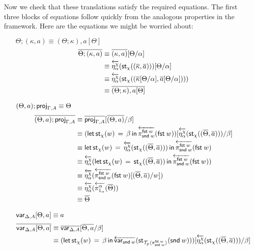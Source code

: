 \documentclass[10pt]{article}
\theoremstyle{definition}
\newcommand\dsd[1]{\ensuremath{\mathsf{#1}}}
\newcommand{\app}[2]{\ensuremath{#1 \: #2}}
\newcommand{\fst}[1]{\app{\dsd{fst}}{#1}}
\newcommand{\snd}[1]{\app{\dsd{snd}}{#1}}
\newcommand{\rewrite}[2]{\overleftarrow{#1}(#2)}
\newcommand\StI[2]{\ensuremath{\mathsf{st}_{#1}(#2)}}
\newcommand\StE[4]{\ensuremath{\mathsf{let} \, \StI{#1}{#3} \, = \, {#2} \, \mathsf{in} \, #4}}
\newcommand\ApEl[2]{\mathcal{T}_{#1}\langle#2\rangle}
\begin{document}
Now we check that these translations satisfy the required equations. The first three blocks of equations follow quickly from the analogous properties in the framework. Here are the equations we might be worried about:
\begin{enumerate}[style = multiline, labelwidth = 80pt]
\item[{$\Theta ; (\kappa , a) \equiv (\Theta ; \kappa) , a[\Theta]$}] 
\begin{align*}
\upstairs{\Theta ; (\kappa , a)}
&\equiv \upstairs{(\kappa, a)}[\Theta/\alpha] \\
&\equiv \rewrite{\eta^\chi_{\alpha}}{\StI{\chi}{(\upstairs{\kappa}, \upstairs{a})}}[\Theta/\alpha] \\
&\equiv \rewrite{\eta^\chi_{\alpha}}{\StI{\chi}{(\upstairs{\kappa}[\Theta/\alpha], \upstairs{a}[\Theta/\alpha])}} \\
&\equiv \upstairs{(\Theta ; \kappa) , a[\Theta]}
\end{align*}
\item[{$(\Theta, a);\mathsf{proj}_{\Gamma,A} \equiv \Theta$}]
\begin{align*}
\upstairs{(\Theta, a);\proj{\Gamma,A}}
&\equiv \upstairs{\proj{\Gamma,A}}[\upstairs{(\Theta, a)}/\beta] \\
&\equiv (\StE{\chi}{\beta}{w}{\rewrite{\pi^{\fst w}_{\snd w}}{\fst w}})[\rewrite{\eta^\chi_{\alpha}}{\StI{\chi}{(\upstairs{\Theta}, \upstairs{a})}}/\beta] \\
&\equiv \StE{\chi}{\rewrite{\eta^\chi_{\alpha}}{\StI{\chi}{(\upstairs{\Theta}, \upstairs{a})}}}{w}{\rewrite{\pi^{\fst w}_{\snd w}}{\fst w}} \\
&\equiv \rewrite{\eta^\chi_{\alpha}}{\StE{\chi}{\StI{\chi}{(\upstairs{\Theta}, \upstairs{a})}}{w}{\rewrite{\pi^{\fst w}_{\snd w}}{\fst w}}} \\
&\equiv \rewrite{\eta^\chi_{\alpha}}{\rewrite{\pi^{\fst w}_{\snd w}}{\fst w}[(\upstairs{\Theta}, \upstairs{a})/w]} \\
&\equiv \rewrite{\eta^\chi_{\alpha}}{\rewrite{\pi^\alpha_{1_\alpha}}{\upstairs{\Theta}}} \\
&\equiv\upstairs{\Theta} 
\end{align*}
\item[{$\mathsf{var}_{\Delta,A}[\Theta, a] \equiv a$}] 
\begin{align*}
\upstairs{\var{\Delta,A}[\Theta, a]} 
&\equiv \upstairs{\var{\Delta,A}}[\upstairs{\Theta, a}/\beta] \\
&\equiv (\StE{\chi}{\beta}{w}{\rewrite{\var{\snd w}}{\StI{\ApEl{p}{\pi^{\fst w}_{\snd w}}}{\snd w}}})[\rewrite{\eta^\chi_{\alpha}}{\StI{\chi}{(\upstairs{\Theta}, \upstairs{a})}}/\beta] \\

\end{align*}
\end{enumerate}
\end{document}
